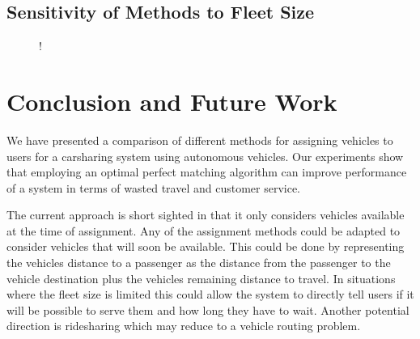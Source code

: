 \documentclass[letterpaper]{article}
\begin{document}
\subsection{Sensitivity of Methods to Fleet Size}

\begin{figure}
\resizebox {\columnwidth} {!} {
}
\end{figure}

\section{Conclusion and Future Work}

We have presented a comparison of different methods for assigning vehicles to users for a carsharing system using autonomous vehicles. Our experiments show that employing an optimal perfect matching algorithm can improve performance of a system in terms of wasted travel and customer service.

The current approach is short sighted in that it only considers vehicles available at the time of assignment. Any of the assignment methods could be adapted to consider vehicles that will soon be available. This could be done by representing the vehicles distance to a passenger as the distance from the passenger to the vehicle destination plus the vehicles remaining distance to travel. In situations where the fleet size is limited this could allow the system to directly tell users if it will be possible to serve them and how long they have to wait. Another potential direction is ridesharing which may reduce to a vehicle routing problem.



\end{document}

